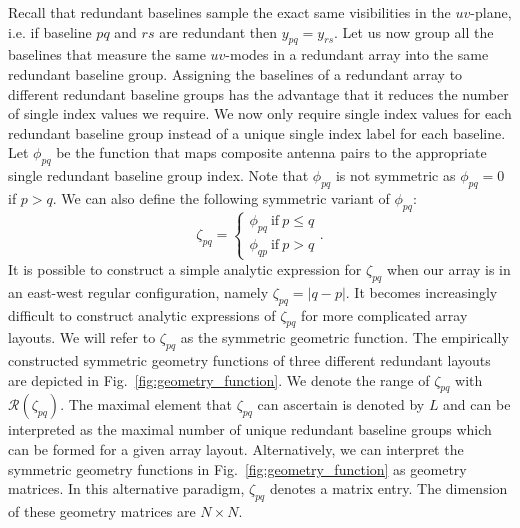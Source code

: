 \documentclass[useAMS,usenatbib]{mn2e}
\begin{document}
Recall that redundant baselines sample the exact same visibilities in the $uv$-plane, i.e. if baseline $pq$ and $rs$ are redundant then $y_{pq} = y_{rs}$. 
Let us now group all the baselines that measure the same $uv$-modes in a redundant array into the same redundant baseline group. Assigning the baselines of a redundant array to different redundant baseline groups has the advantage that it reduces the number of single index values we require. We now only require single index values for each redundant baseline group instead of a unique single index label for 
each baseline. Let $\phi_{pq}$ be the function that maps composite antenna pairs to the appropriate single redundant baseline group index. Note that $\phi_{pq}$ is not symmetric as 
$\phi_{pq} = 0$ if $p>q$. We can also define the following symmetric variant of $\phi_{pq}$:
\begin{equation}
\zeta_{pq} = 
\begin{cases}
\phi_{pq}~\textrm{if}~p \leq q\\
\phi_{qp}~\textrm{if}~p>q
\end{cases}.
\end{equation} 
It is possible to construct a simple analytic expression for $\zeta_{pq}$ when our array is in an east-west regular configuration, namely $\zeta_{pq} = |q-p|$. 
It becomes increasingly difficult to construct analytic expressions of $\zeta_{pq}$ for more complicated array layouts. 
We will refer to $\zeta_{pq}$ as the symmetric geometric function. The empirically constructed symmetric geometry
functions of three different redundant layouts are depicted in Fig.~\ref{fig:geometry_function}. We denote the range of $\zeta_{pq}$ with $\mathcal{R}(\zeta_{pq})$. The maximal element 
that $\zeta_{pq}$ can ascertain is denoted by $L$ and can be interpreted as the maximal number of unique redundant baseline groups which can be formed for a given 
array layout. Alternatively, we can interpret the symmetric geometry functions in Fig.~\ref{fig:geometry_function} as geometry matrices. In this alternative paradigm, $\zeta_{pq}$ denotes a matrix entry. The dimension of these geometry 
matrices are $N\times N$. 
\end{document}
